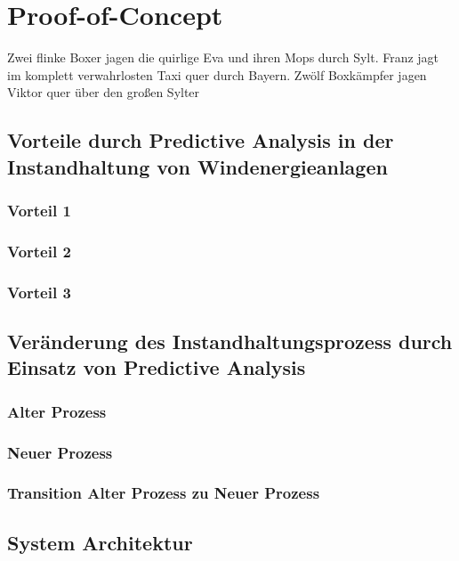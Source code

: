 \section{Proof-of-Concept}
Zwei flinke Boxer jagen die quirlige Eva und ihren Mops durch Sylt. Franz jagt im komplett verwahrlosten Taxi quer durch Bayern. Zwölf Boxkämpfer jagen Viktor quer über den großen Sylter

\subsection{Vorteile durch Predictive Analysis in der Instandhaltung von Windenergieanlagen}

\subsubsection{Vorteil 1}

\subsubsection{Vorteil 2}

\subsubsection{Vorteil 3}

\subsection{Veränderung des Instandhaltungsprozess durch Einsatz von Predictive Analysis}

\subsubsection{Alter Prozess}

\subsubsection{Neuer Prozess}

\subsubsection{Transition Alter Prozess zu Neuer Prozess}

\subsection{System Architektur}

